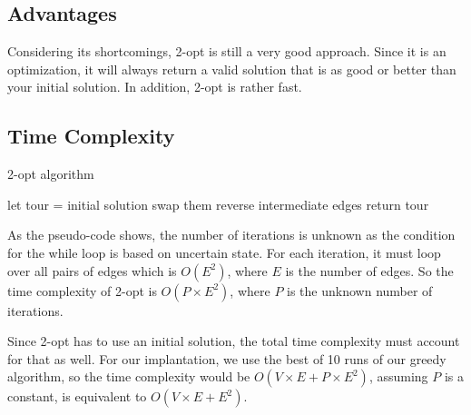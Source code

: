 \documentclass[12pt]{report}
\begin{document}
\begin{multicols}{2}
    \subsection{Advantages}
    Considering its shortcomings, 2-opt is still a very good approach. Since it is an optimization, it will always return a valid solution that is as good or better than your initial solution. In addition, 2-opt is rather fast.
\end{multicols}

\subsection{Time Complexity}
\begin{algorithm}
\caption{2-opt algorithm}
\label{2opt_Alg}
\begin{algorithmic}[1]
    \State let tour = initial solution
    \State swap them
    \State reverse intermediate edges
    \EndIf
    \EndFor
    \EndWhile
    \State return tour
\EndProcedure
\end{algorithmic}
\end{algorithm}

\begin{multicols}{2}
    As the pseudo-code shows, the number of iterations is unknown as the condition for the while loop is based on uncertain state. For each iteration, it must loop over all pairs of edges which is $O(E^2)$, where $E$ is the number of edges. So the time complexity of 2-opt is $O(P \times E^2)$, where $P$ is the unknown number of iterations.

    Since 2-opt has to use an initial solution, the total time complexity must account for that as well. For our implantation, we use the best of 10 runs of our greedy algorithm, so the time complexity would be $O(V \times E + P \times E^2)$, assuming $P$ is a constant, is equivalent to $O(V \times E + E^2)$.
\end{multicols}

% 
%
\end{document}
